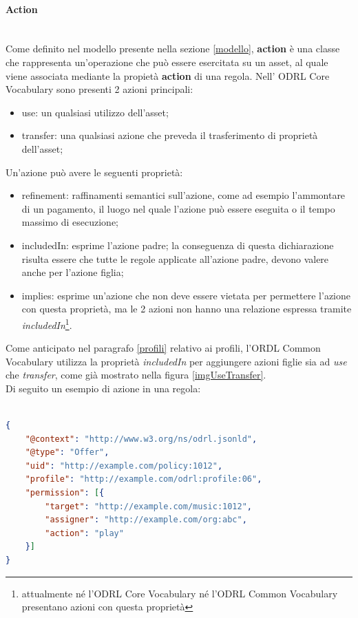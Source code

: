 \documentclass[12pt,a4paper,twoside]{book}
\begin{document}
\paragraph{Action}\mbox{}\\
Come definito nel modello presente nella sezione \ref{modello}, \textbf{action} è una classe che rappresenta un'operazione che può essere esercitata su un asset, al quale viene associata mediante la propietà \textbf{action} di una regola. Nell' ODRL Core Vocabulary sono presenti 2 azioni principali:
\begin{itemize}
	\item use: un qualsiasi utilizzo dell'asset;
	\item transfer: una qualsiasi azione che preveda il trasferimento di proprietà dell'asset;
\end{itemize}
Un'azione può avere le seguenti proprietà:
\begin{itemize}\label{includesProp}
	\item refinement: raffinamenti semantici sull'azione, come ad esempio l'ammontare di un pagamento, il luogo nel quale l'azione può essere eseguita o il tempo massimo di esecuzione;
	\item includedIn: esprime l'azione padre; la conseguenza di questa dichiarazione risulta essere che tutte le regole applicate all'azione padre, devono valere anche per l'azione figlia;
	\item implies: esprime un'azione che non deve essere vietata per permettere l'azione con questa proprietà, ma le 2 azioni non hanno una relazione espressa tramite \textit{includedIn}\footnote{attualmente né l'ODRL Core Vocabulary né l'ODRL Common Vocabulary presentano azioni con questa proprietà}. 
\end{itemize}
Come anticipato nel paragrafo \ref{profili} relativo ai profili, l'ORDL Common Vocabulary utilizza la proprietà \textit{includedIn} per aggiungere azioni figlie sia ad \textit{use} che \textit{transfer}, come già mostrato nella figura \ref{imgUseTransfer}.\\
Di seguito un esempio di azione in una regola:
\begin{lstlisting}[language=json,firstnumber=1,caption={L'azione \textbf{play} è presente nella proprietà \textbf{action} della regola},captionpos=b,label=esempioAction]

{
	"@context": "http://www.w3.org/ns/odrl.jsonld",
	"@type": "Offer",
	"uid": "http://example.com/policy:1012",
	"profile": "http://example.com/odrl:profile:06",
	"permission": [{
		"target": "http://example.com/music:1012",
		"assigner": "http://example.com/org:abc",
		"action": "play"
	}]
}
\end{lstlisting}
\end{document}
